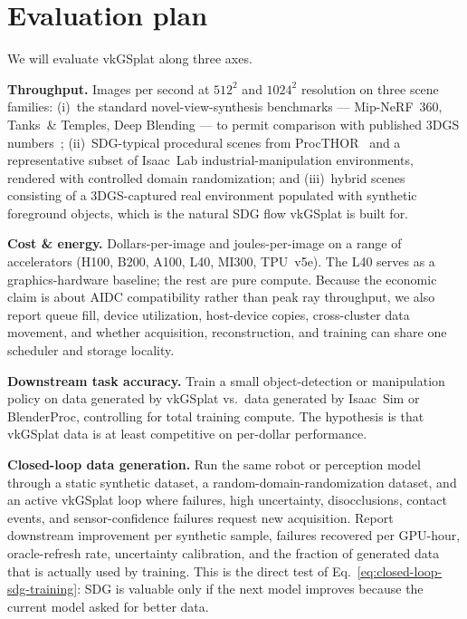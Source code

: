 \documentclass[10pt,journal,onecolumn]{IEEEtran}
\begin{document}
\section{Evaluation plan}

We will evaluate vkGSplat along three axes.

\textbf{Throughput.} Images per second at $512^2$ and $1024^2$
resolution on three scene families:
(i)~the standard novel-view-synthesis benchmarks --- Mip-NeRF~360,
Tanks~\& Temples, Deep Blending --- to permit comparison with
published 3DGS numbers~\cite{kerbl20233dgs};
(ii)~SDG-typical procedural scenes from ProcTHOR~\cite{deitke2022procthor}
and a representative subset of Isaac~Lab industrial-manipulation
environments, rendered with controlled domain randomization;
and (iii)~hybrid scenes consisting of a 3DGS-captured real environment
populated with synthetic foreground objects, which is the natural SDG
flow vkGSplat is built for.

\textbf{Cost \& energy.} Dollars-per-image and joules-per-image on a
range of accelerators (H100, B200, A100, L40, MI300, TPU~v5e). The L40
serves as a graphics-hardware baseline; the rest are pure compute. Because the
economic claim is about AIDC compatibility rather than peak ray throughput, we
also report queue fill, device utilization, host-device copies, cross-cluster
data movement, and whether acquisition, reconstruction, and training can share
one scheduler and storage locality.

\textbf{Downstream task accuracy.} Train a small object-detection or
manipulation policy on data generated by vkGSplat vs.\ data generated by
Isaac~Sim or BlenderProc, controlling for total training compute. The
hypothesis is that vkGSplat data is at least competitive on per-dollar
performance.

\textbf{Closed-loop data generation.} Run the same robot or perception model
through a static synthetic dataset, a random-domain-randomization dataset, and
an active vkGSplat loop where failures, high uncertainty, disocclusions, contact
events, and sensor-confidence failures request new acquisition. Report
downstream improvement per synthetic sample, failures recovered per GPU-hour,
oracle-refresh rate, uncertainty calibration, and the fraction of generated
data that is actually used by training. This is the direct test of
Eq.~\ref{eq:closed-loop-sdg-training}: SDG is valuable only if the next model
improves because the current model asked for better data.
\end{document}

